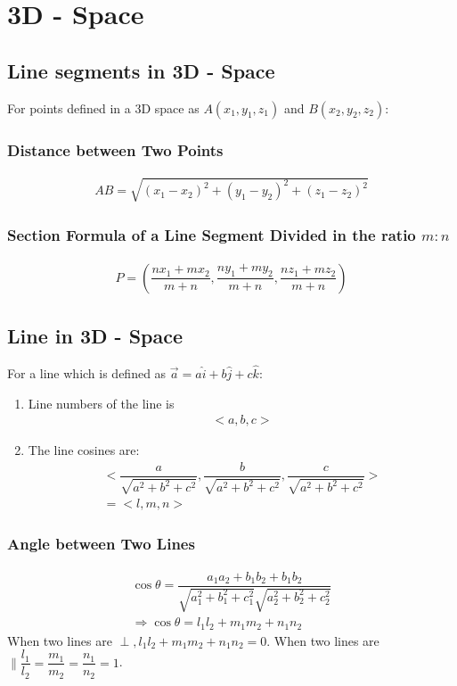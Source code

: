 \documentclass[../main.tex]{subfile}
\begin{document}
    \chapter{3D - Space}
    \section{Line segments in 3D - Space}
        For points defined in a 3D space as $A(x_1,y_1,z_1)$ and $B(x_2,y_2,z_2)$:
        \subsection{Distance between Two Points}
            \begin{align}
                AB=\sqrt{(x_1-x_2)^2+(y_1-y_2)^2+(z_1-z_2)^2}
            \end{align}

        \subsection{Section Formula of a Line Segment Divided in the ratio $m:n$}
        \begin{align}
            P=\left(\dfrac{nx_1+mx_2}{m+n},\dfrac{ny_1+my_2}{m+n},\dfrac{nz_1+mz_2}{m+n}\right)
        \end{align}

    \section{Line in 3D - Space}
    For a line which is defined as $\vec{a}=a\hat{i}+b\hat{j}+c\hat{k}$:
    \begin{enumerate}
    \item Line numbers of the line is
    \begin{align}
        <a,b,c>
    \end{align}
    \item The line cosines are:
    \begin{align}
        <\dfrac{a}{\sqrt{a^2+b^2+c^2}},\dfrac{b}{\sqrt{a^2+b^2+c^2}},\dfrac{c}{\sqrt{a^2+b^2+c^2}}>\\
        =<l,m,n>
    \end{align}
    \end{enumerate}

    \subsection{Angle between Two Lines}
    \begin{align}
        \cos \theta	=\dfrac{a_1a_2+b_1b_2+b_1b_2}{\sqrt{a_1^2+b_1^2+c_1^2}\sqrt{a_2^2+b_2^2+c_2^2}}\\
        \Rightarrow \cos \theta= l_1l_2+m_1m_2+n_1n_2
    \end{align}
    When two lines are $\perp, l_1l_2+m_1m_2+n_1n_2=0$.\newline
    When two lines are $\parallel \dfrac{l_1}{l_2}=\dfrac{m_1}{m_2}=\dfrac{n_1}{n_2}=1$.
\end{document}
